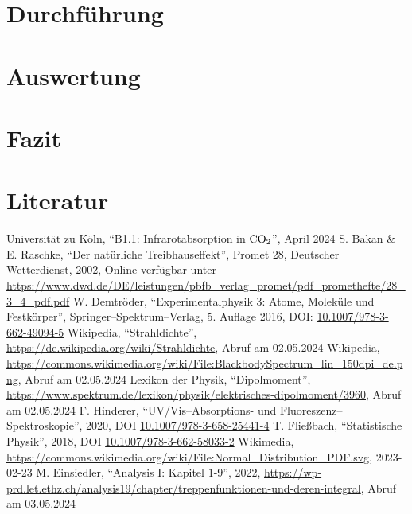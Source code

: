 \documentclass[12pt,a4paper]{scrartcl}
\numberwithin{equation}{section} %
\renewcommand{\[}{} %
\renewcommand{\]}{\noindent} %
\begin{document}
\clearpage
\hypertarget{durchfuxfchrung}{%
\section{Durchführung}\label{durchfuxfchrung}}

\clearpage
\hypertarget{auswertung}{%
\section{Auswertung}\label{auswertung}}

\clearpage
\hypertarget{fazit}{%
\section{Fazit}\label{fazit}}

\clearpage
\hypertarget{literatur}{%
\section{Literatur}\label{literatur}}
\renewcommand{\section}[2]{} %
\begin{thebibliography}{9}
	Universität zu Köln, ``B1.1: Infrarotabsorption in \(\ce{CO_2}\)'', April 2024
  S. Bakan \& E. Raschke, ``Der natürliche Treibhauseffekt'', Promet 28,
	Deutscher Wetterdienst, 2002, Online verfügbar unter
	\url{https://www.dwd.de/DE/leistungen/pbfb_verlag_promet/pdf_promethefte/28_3_4_pdf.pdf}
	W. Demtröder, ``Experimentalphysik 3: Atome, Moleküle und Festkörper'',
	Springer--Spektrum--Verlag, 5. Auflage 2016, DOI:
	\href{https://doi.org/10.1007/978-3-662-49094-5}{10.1007/978-3-662-49094-5}
	Wikipedia, ``Strahldichte'',
	\url{https://de.wikipedia.org/wiki/Strahldichte}, Abruf am 02.05.2024
	Wikipedia, \url{https://commons.wikimedia.org/wiki/File:BlackbodySpectrum_lin_150dpi_de.png},
	Abruf am 02.05.2024
	Lexikon der Physik, ``Dipolmoment'',
	\url{https://www.spektrum.de/lexikon/physik/elektrisches-dipolmoment/3960},
	Abruf am 02.05.2024
	F. Hinderer, ``UV/Vis--Absorptions- und Fluoreszenz--Spektroskopie'',
	2020, DOI \href{https://doi.org/10.1007/978-3-658-25441-4}{10.1007/978-3-658-25441-4}
	T. Fließbach, ``Statistische Physik'', 2018, DOI
	\href{https://doi.org/10.1007/978-3-662-58033-2}{10.1007/978-3-662-58033-2}
	Wikimedia,
	\url{https://commons.wikimedia.org/wiki/File:Normal_Distribution_PDF.svg},
	2023-02-23
	M. Einsiedler, ``Analysis I: Kapitel \(1\)-\(9\)'', 2022,
	\url{https://wp-prd.let.ethz.ch/analysis19/chapter/treppenfunktionen-und-deren-integral},
	Abruf am 03.05.2024
\end{thebibliography}
\end{document}
